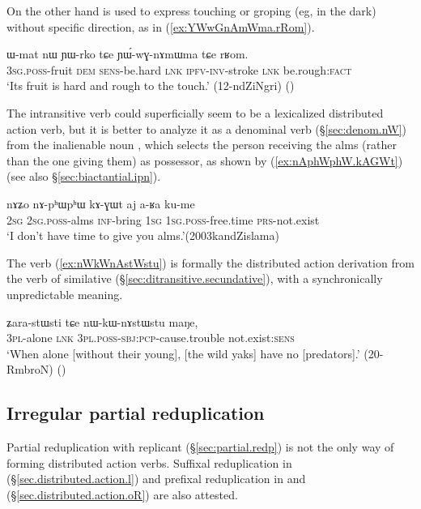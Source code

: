 On the other hand  is used to express touching or groping (eg, in the dark) without specific direction, as in (\ref{ex:YWwGnAmWma.rRom}).

\begin{exe}
\ex \label{ex:YWwGnAmWma.rRom}
\gll ɯ-mat nɯ ɲɯ-rko tɕe ɲɯ́-wɣ-nɤmɯma tɕe rʁom.\\
\textsc{3sg}.\textsc{poss}-fruit \textsc{dem} \textsc{sens}-be.hard \textsc{lnk} \textsc{ipfv}-\textsc{inv}-stroke \textsc{lnk} be.rough:\textsc{fact}\\
\glt `Its fruit is hard and rough to the touch.' (12-ndZiNgri)
()
\end{exe}

The intransitive verb  could superficially seem to be a lexicalized distributed action verb, but it is better to analyze it as a denominal verb (§\ref{sec:denom.nW}) from the inalienable noun , which selects the person receiving the alms (rather than the one giving them) as possessor, as shown by (\ref{ex:nAphWphW.kAGWt}) (see also §\ref{sec:biactantial.ipn}).

\begin{exe}
\ex \label{ex:nAphWphW.kAGWt}
\gll nɤʑo nɤ-pʰɯpʰɯ kɤ-ɣɯt aj a-ʁa ku-me \\
\textsc{2sg} \textsc{2sg}.\textsc{poss}-alms \textsc{inf}-bring \textsc{1sg} \textsc{1sg}.\textsc{poss}-free.time \textsc{prs}-not.exist \\
\glt `I don't have time to give you alms.'(2003kandZislama)
\end{exe}

The verb  (\ref{ex:nWkWnAstWstu}) is formally the distributed action derivation from the verb of similative  (§\ref{sec:ditransitive.secundative}), with a synchronically unpredictable meaning.

\begin{exe}
\ex \label{ex:nWkWnAstWstu}
\gll ʑara-stɯsti tɕe nɯ-kɯ-nɤstɯstu maŋe, \\
\textsc{3pl}-alone \textsc{lnk} \textsc{3pl}.\textsc{poss}-\textsc{sbj}:\textsc{pcp}-cause.trouble not.exist:\textsc{sens} \\
\glt `When alone [without their young], [the wild yaks] have no [predators].' (20-RmbroN) ()
\end{exe}

 
\subsection{Irregular partial reduplication}   \label{sec:irregular.reduplication}
Partial reduplication with  replicant (§\ref{sec:partial.redp}) is not the only way of forming distributed action verbs. Suffixal reduplication in  (§\ref{sec.distributed.action.l}) and prefixal reduplication in  and  (§\ref{sec.distributed.action.oR}) are also attested.

